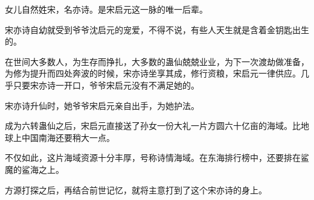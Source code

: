 \begin{this_body}
女儿自然姓宋，名亦诗。是宋启元这一脉的唯一后辈。

宋亦诗自幼就受到爷爷沈启元的宠爱，不得不说，有些人天生就是含着金钥匙出生的。

在世间大多数人，为生存而挣扎，大多数的蛊仙兢兢业业，为下一次渡劫做准备，为修为提升而四处奔波的时候，宋亦诗坐享其成，修行资粮，宋启元一律供应。几乎只要宋亦诗一开口，爷爷宋启元没有不满足她的。

宋亦诗升仙时，她爷爷宋启元亲自出手，为她护法。

成为六转蛊仙之后，宋启元直接送了孙女一份大礼一片方圆六十亿亩的海域。比地球上中国南海还要稍大一点。

不仅如此，这片海域资源十分丰厚，号称诗情海域。在东海排行榜中，还要排在鲨魔的鲨海之上。

方源打探之后，再结合前世记忆，就将主意打到了这个宋亦诗的身上。

\end{this_body}

